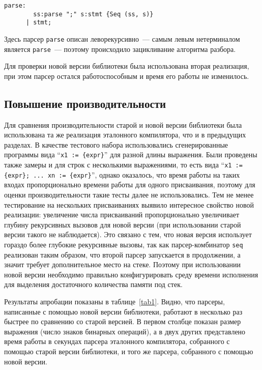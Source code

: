 \documentclass[conference]{IEEEtran}
\begin{document}
\begin{lstlisting}[basicstyle=\small]
  parse:
        ss:parse ";" s:stmt {Seq (ss, s)}
      | stmt;
\end{lstlisting}

Здесь парсер \lstinline|parse| описан леворекурсивно~--- самым левым нетерминалом является \lstinline|parse|~--- поэтому происходило зацикливание алгоритма разбора.

Для проверки новой версии библиотеки была использована вторая реализация, при этом парсер остался работоспособным и время его работы не изменилось.

\subsection{Повышение производительности}

Для сравнения производительности старой и новой версии библиотеки была использована та же реализация эталонного компилятора, что и в предыдущих разделах. В качестве тестового
набора использовались сгенерированные программы вида ``\lstinline|x1 := {expr}|'' для разной длины выражения.  Были проведены также замеры и для строк с несколькими
выражениями, то есть вида ``\lstinline|x1 := {expr}; ... xn := {expr}|'', однако оказалось, что время работы на таких входах пропорционально времени работы для одного присваивания,
поэтому для оценки производительности такие тесты далее не использовались. Тем не менее тестирование на нескольких присваиваниях выявило интересное свойство новой реализации:
увеличение числа присваиваний пропорционально увеличивает глубину рекурсивных вызовов для новой версии (при использовании старой версии такого не наблюдается). Это связано с тем,
что новая версия использует гораздо более глубокие рекурсивные вызовы, так как парсер-комбинатор \lstinline|seq| реализован таким образом, что второй парсер запускается в продолжении,
а значит требует дополнительное место на стеке. Поэтому при использовании новой версии необходимо правильно конфигурировать среду времени исполнения для выделения достаточного
количества памяти под стек.

Результаты апробации показаны в таблице~\ref{tab1}. Видно, что парсеры, написанные с помощью новой версии библиотеки, работают в несколько раз быстрее по сравнению со старой версией.
В первом столбце показан размер выражения (число знаков бинарных операций), а в двух других представлено время работы в секундах парсера эталонного компилятора, собранного с помощью старой версии библиотеки, и того же парсера, собранного с помощью новой версии.
\end{document}
